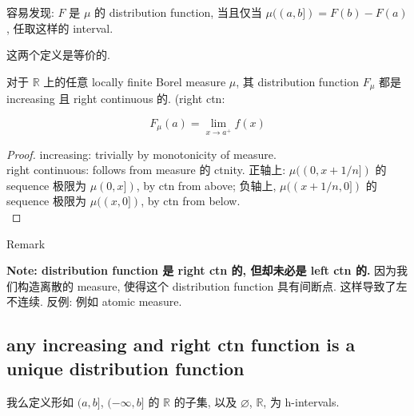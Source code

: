 \begin{proposition}

容易发现: \(F\) 是 \(\mu\) 的 distribution function, 当且仅当 \(\mu((a,b\rbrack) = F(b) - F(a)\), 任取这样的 interval.

\end{proposition}

这两个定义是等价的.

\begin{theorem}{}

对于 \(\mathbb{R}\) 上的任意 locally finite Borel measure \(\mu\), 其 distribution function \(F_{\mu}\) 都是 increasing 且 right continuous 的. (right ctn:

\[F_{\mu}(a) = \lim\limits_{x\rightarrow a^{+}}f(x)\]

\end{theorem}

\begin{proof}

increasing: trivially by monotonicity of measure.\\
right continuous: follows from measure 的 ctnity. 正轴上: \(\mu((0,x + 1/n\rbrack)\) 的 sequence 极限为 \(\mu(0,x\rbrack)\), by ctn from above; 负轴上, \(\mu((x + 1/n,0\rbrack)\) 的 sequence 极限为 \(\mu((x,0\rbrack)\), by ctn from below.\\

\end{proof}

\begin{qlremark}{Remark}

\textbf{Note: distribution function 是 right ctn 的, 但却未必是 left ctn 的.} 因为我们构造离散的 measure, 使得这个 distribution function 具有间断点. 这样导致了左不连续. 反例: 例如 atomic measure.

\end{qlremark}

\subsection{any increasing and right ctn function is a unique distribution function}\label{any-increasing-and-right-ctn-function-is-a-unique-distribution-function}

\begin{definition}{}

我么定义形如 \((a,b\rbrack\), \(( - \infty,b\rbrack\) 的 \(\mathbb{R}\) 的子集, 以及 \(\varnothing\), \(\mathbb{R}\), 为 h-intervals.

\end{definition}

